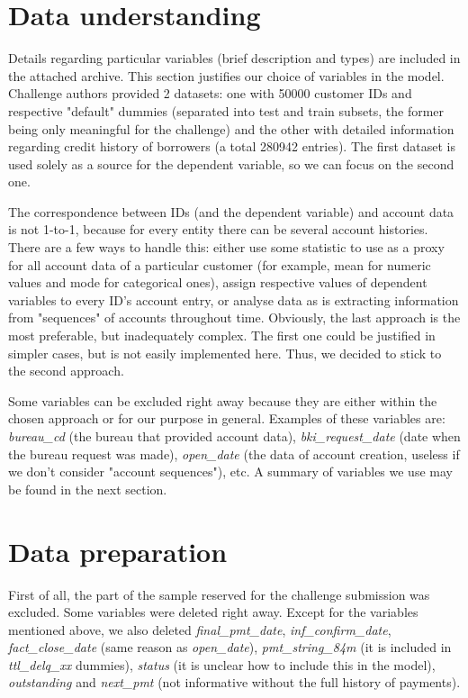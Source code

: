\documentclass[12pt,a4paper]{article}
\begin{document}
\section{Data understanding}
Details regarding particular variables (brief description and types) are included in the attached archive. This section justifies our choice of variables in the model. Challenge authors provided 2 datasets: one with 50000 customer IDs and respective "default" dummies (separated into test and train subsets, the former being only meaningful for the challenge) and the other with detailed information regarding credit history of borrowers (a total 280942 entries). The first dataset is used solely as a source for the dependent variable, so we can focus on the second one.

The correspondence between IDs (and the dependent variable) and account data is not 1-to-1, because for every entity there can be several account histories. There are a few ways to handle this: either use some statistic to use as a proxy for all account data of a particular customer (for example, mean for numeric values and mode for categorical ones), assign respective values of dependent variables to every ID's account entry, or analyse data as is extracting information from "sequences" of accounts throughout time. Obviously, the last approach is the most preferable, but inadequately complex. The first one could be justified in simpler cases, but is not easily implemented here. Thus, we decided to stick to the second approach.

Some variables can be excluded right away because they are either within the chosen approach or for our purpose in general. Examples of these variables are: \textit{bureau\_cd} (the bureau that provided account data), \textit{bki\_request\_date} (date when the bureau request was made), \textit{open\_date} (the data of account creation, useless if we don't consider "account sequences"), etc. A summary of variables we use may be found in the next section.

\section{Data preparation}
First of all, the part of the sample reserved for the challenge submission was excluded. Some variables were deleted right away. Except for the variables mentioned above, we also deleted \textit{final\_pmt\_date}, \textit{inf\_confirm\_date}, \textit{fact\_close\_date} (same reason as \textit{open\_date}), \textit{pmt\_string\_84m} (it is included in \textit{ttl\_delq\_xx} dummies), \textit{status} (it is unclear how to include this in the model), \textit{outstanding} and \textit{next\_pmt} (not informative without the full history of payments).
\end{document}
